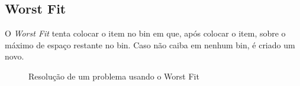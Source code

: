 \subsection{Worst Fit}

O \textit{Worst Fit} tenta colocar o item no bin em que, após colocar o item, sobre o máximo de espaço restante
no bin. Caso não caiba em nenhum bin, é criado um novo.

\begin{figure}[H]
  \centering
  \caption{Resolução de um problema usando o Worst Fit}
\end{figure}

